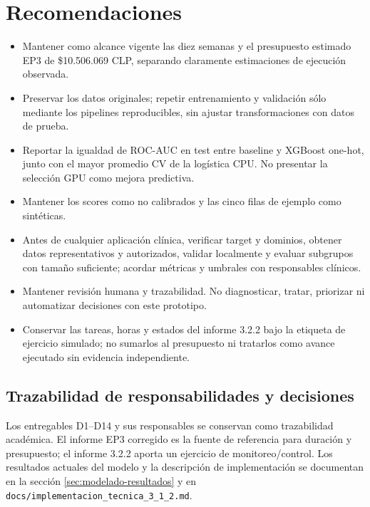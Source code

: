\section{Recomendaciones}

\begin{itemize}
  \item Mantener como alcance vigente las diez semanas y el presupuesto estimado EP3 de \$10.506.069 CLP, separando claramente estimaciones de ejecución observada.
  \item Preservar los datos originales; repetir entrenamiento y validación sólo mediante los pipelines reproducibles, sin ajustar transformaciones con datos de prueba.
  \item Reportar la igualdad de ROC-AUC en test entre baseline y XGBoost one-hot, junto con el mayor promedio CV de la logística CPU. No presentar la selección GPU como mejora predictiva.
  \item Mantener los scores como no calibrados y las cinco filas de ejemplo como sintéticas.
  \item Antes de cualquier aplicación clínica, verificar target y dominios, obtener datos representativos y autorizados, validar localmente y evaluar subgrupos con tamaño suficiente; acordar métricas y umbrales con responsables clínicos.
  \item Mantener revisión humana y trazabilidad. No diagnosticar, tratar, priorizar ni automatizar decisiones con este prototipo.
  \item Conservar las tareas, horas y estados del informe 3.2.2 bajo la etiqueta de ejercicio simulado; no sumarlos al presupuesto ni tratarlos como avance ejecutado sin evidencia independiente.
\end{itemize}

\subsection{Trazabilidad de responsabilidades y decisiones}

Los entregables D1--D14 y sus responsables se conservan como trazabilidad académica. El informe EP3 corregido es la fuente de referencia para duración y presupuesto; el informe 3.2.2 aporta un ejercicio de monitoreo/control. Los resultados actuales del modelo y la descripción de implementación se documentan en la sección \ref{sec:modelado-resultados} y en \texttt{docs/implementacion\_tecnica\_3\_1\_2.md}.
